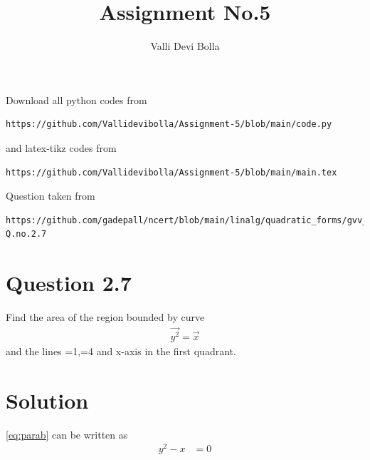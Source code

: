 \documentclass[journal,12pt,twocolumn]{IEEEtran}
\begin{document}
\def\rightbox#1{\makebox[0in][r]{#1}}
\def\centbox#1{\makebox[0in]{#1}}
\def\topbox#1{\raisebox{-\baselineskip}[0in][0in]{#1}}
\def\midbox#1{\raisebox{-0.5\baselineskip}[0in][0in]{#1}}
\vspace{3cm}
\title{Assignment No.5}
\author{Valli Devi Bolla}
\maketitle
\newpage
\bigskip
\renewcommand{\thefigure}{\theenumi}
\renewcommand{\thetable}{\theenumi}
Download all python codes from
\begin{lstlisting}
https://github.com/Vallidevibolla/Assignment-5/blob/main/code.py
\end{lstlisting}
%
and latex-tikz codes from
%
\begin{lstlisting}
https://github.com/Vallidevibolla/Assignment-5/blob/main/main.tex
\end{lstlisting}
%
Question taken from
\begin{lstlisting}
https://github.com/gadepall/ncert/blob/main/linalg/quadratic_forms/gvv_ncert_quadratic_forms.pdf-Q.no.2.7
\end{lstlisting}
%
%
\section{Question 2.7}
Find the area of the region bounded by curve 
\begin{align}
\vec{y^2} = \vec{x}
\label{eq:parab}
\end{align}
and the lines =1,=4 and x-axis in the first quadrant.
\\
\section{Solution}
\eqref{eq:parab} can be written as
\begin{align}
y^2 - x &= 0
\label{eq:parab_twovar}
\end{align}
\end{document}
